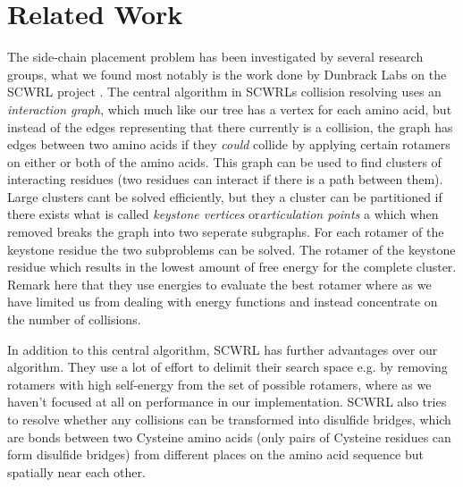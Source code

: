 \section{Related Work}
The side-chain placement problem has been investigated by several
research groups, what we found most notably is the work done by
Dunbrack Labs on the SCWRL project \cite{canutescu2003graph,
  krivov2009improved}. The central algorithm in SCWRLs collision
resolving uses an \textit{interaction graph}, which much like our tree
has a vertex for each amino acid, but instead of the edges
representing that there currently is a collision, the graph has edges
between two amino acids if they \textit{could} collide by applying
certain rotamers on either or both of the amino acids. This graph can
be used to find clusters of interacting residues (two residues can
interact if there is a path between them). Large clusters cant be
solved efficiently, but they a cluster can be partitioned if there
exists what is called \textit{keystone vertices}
or\textit{articulation points} a which when removed breaks the graph
into two seperate subgraphs. For each rotamer of the keystone residue
the two subproblems can be solved. The rotamer of the keystone residue
which results in the lowest amount of free energy for the complete
cluster. Remark here that they use energies to evaluate the best
rotamer where as we have limited us from dealing with energy
functions and instead concentrate on the number of collisions.

In addition to this central algorithm, SCWRL has further advantages
over our algorithm. They use a lot of effort to delimit their search
space e.g. by removing rotamers with high self-energy from the set of
possible rotamers, where as we haven't focused at all on performance
in our implementation. SCWRL also tries to resolve whether any
collisions can be transformed into disulfide bridges, which are bonds
between two Cysteine amino acids (only pairs of Cysteine residues can form
disulfide bridges) from different places on the amino acid sequence
but spatially near each other.


